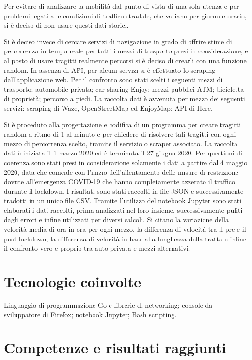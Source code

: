 \documentclass[a4paper,11pt]{article}
\begin{document}
\large{
Per evitare di analizzare la mobilità dal punto di vista di una sola utenza e per problemi legati alle condizioni di traffico stradale, che variano per giorno e orario, si è deciso di non usare questi dati storici.

Si è deciso invece di cercare servizi di navigazione in grado di offrire stime di percorrenza in tempo reale per tutti i mezzi di trasporto presi in considerazione, e al posto di usare tragitti realmente percorsi si è deciso di crearli con una funzione random. In assenza di API, per alcuni servizi si è effettuato lo scraping dall'applicazione web. Per il confronto sono stati scelti i seguenti mezzi di trasporto: automobile privata; car sharing Enjoy; mezzi pubblici ATM; bicicletta di proprietà; percorso a piedi. La raccolta dati è avvenuta per mezzo dei seguenti servizi: scraping di Waze, OpenStreetMap ed EnjoyMap; API di Here.

Si è proceduto alla progettazione e codifica di un programma per creare tragitti random a ritmo di 1 al minuto e per chiedere di risolvere tali tragitti con ogni mezzo di percorrenza scelto, tramite il servizio o scraper associato. La raccolta dati è iniziata il 1 marzo 2020 ed è terminata il 27 giugno 2020. Per questioni di coerenza sono stati presi in considerazione solamente i dati a partire dal 4 maggio 2020, data che coincide con l'inizio dell'allentamento delle misure di restrizione dovute all'emergenza COVID-19 che hanno completamente azzerato il traffico durante il lockdown. I risultati sono stati raccolti in file JSON e successivamente tradotti in un unico file CSV. Tramite l'utilizzo del notebook Jupyter sono stati elaborati i dati raccolti, prima analizzati nel loro insieme, successivamente puliti dagli errori e infine utilizzati per diversi calcoli. Si citano la variazione della velocità media di ora in ora per ogni mezzo, la differenza di velocità tra il pre e il post lockdown, la differenza di velocità in base alla lunghezza della tratta e infine il confronto vero e proprio tra auto privata e mezzi alternativi.
}

\section{Tecnologie coinvolte}

Linguaggio di programmazione Go e librerie di networking; console da sviluppatore di Firefox; notebook Jupyter; Bash scripting.

\section{Competenze e risultati raggiunti}
\end{document}
